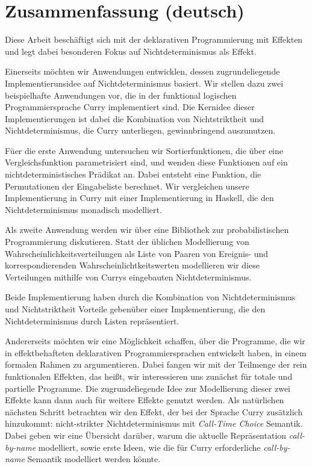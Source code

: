 \chapter*{Zusammenfassung (deutsch)}
\label{sec:abstract-diff}

Diese Arbeit besch\"aftigt sich mit der deklarativen Programmierung mit Effekten und legt dabei besonderen Fokus auf Nichtdeterminismus als Effekt.

Einerseits m\"ochten wir Anwendungen entwicklen, dessen zugrundeliegende Implementierunsidee auf Nichtdeterminismus basiert.
Wir stellen dazu zwei beispielhafte Anwendungen vor, die in der funktional logischen Programmiersprache Curry implementiert sind.
Die Kernidee dieser Implementierungen ist dabei die Kombination von Nichtstriktheit und Nichtdeterminismus, die Curry unterliegen, gewinnbringend auszunutzen.

F\"uer die erste Anwendung untersuchen wir Sortierfunktionen, die \"uber eine Vergleichsfunktion parametrisiert sind, und wenden diese Funktionen auf ein nichtdeterministisches Pr\"adikat an.
Dabei entsteht eine Funktion, die Permutationen der Eingabeliste berechnet.
Wir vergleichen unsere Implementierung in Curry mit einer Implementierung in Haskell, die den Nichtdeterminismus monadisch modelliert.

Als zweite Anwendung werden wir \"uber eine Bibliothek zur probabilistischen Programmierung diskutieren.
Statt der \"ublichen Modellierung von Wahrscheinlichkeitsverteilungen als Liste von Paaren von Ereignis- und korrespondierenden Wahrscheinlichtkeitswerten modellieren wir diese Verteilungen mithilfe von Currys eingebauten Nichtdeterminismus.

Beide Implementierung haben durch die Kombination von Nichtdeterminismus und Nichtstriktheit Vorteile geben\"uber einer Implementierung, die den Nichtdeterminismus durch Listen repr\"asentiert.

Andererseits m\"ochten wir eine M\"oglichkeit schaffen, \"uber die Programme, die wir in effektbehafteten deklarativen Programmiersprachen entwickelt haben, in einem formalen Rahmen zu argumentieren.
Dabei fangen wir mit der Teilmenge der rein funktionalen Effekten, das hei\ss{}t, wir interessieren uns zun\"achst f\"ur totale und partielle Programme.
Die zugrundeliegende Idee zur Modellierung dieser zwei Effekte kann dann auch f\"ur weitere Effekte genutzt werden.
Als nat\"urlichen n\"achsten Schritt betrachten wir den Effekt, der bei der Sprache Curry zus\"atzlich hinzukommt: nicht-strikter Nichtdeterminismus mit \emph{Call-Time Choice} Semantik.
Dabei geben wir eine \"Ubersicht dar\"uber, warum die aktuelle Repr\"asentation \emph{call-by-name} modelliert, sowie erste Ideen, wie die f\"ur Curry erforderliche \emph{call-by-name} Semantik modelliert werden k\"onnte.

\endgroup